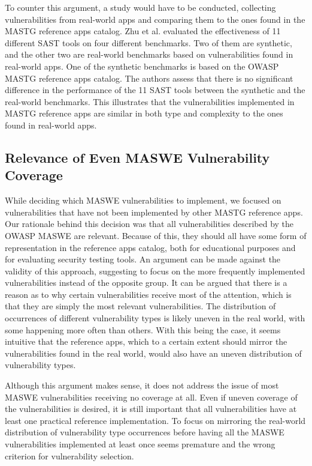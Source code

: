 To counter this argument, a study would have to be conducted, collecting vulnerabilities from real-world apps and comparing them to the ones found in the MASTG reference apps catalog. Zhu et al. \cite{paper_19} evaluated the effectiveness of 11 different SAST tools on four different benchmarks. Two of them are synthetic, and the other two are real-world benchmarks based on vulnerabilities found in real-world apps. One of the synthetic benchmarks is based on the OWASP MASTG reference apps catalog. The authors assess that there is no significant difference in the performance of the 11 SAST tools between the synthetic and the real-world benchmarks. This illustrates that the vulnerabilities implemented in MASTG reference apps are similar in both type and complexity to the ones found in real-world apps.

\subsection{Relevance of Even MASWE Vulnerability Coverage}
While deciding which MASWE vulnerabilities to implement, we focused on vulnerabilities that have not been implemented by other MASTG reference apps. Our rationale behind this decision was that all vulnerabilities described by the OWASP MASWE are relevant. Because of this, they should all have some form of representation in the reference apps catalog, both for educational purposes and for evaluating security testing tools. An argument can be made against the validity of this approach, suggesting to focus on the more frequently implemented vulnerabilities instead of the opposite group. It can be argued that there is a reason as to why certain vulnerabilities receive most of the attention, which is that they are simply the most relevant vulnerabilities. The distribution of occurrences of different vulnerability types is likely uneven in the real world, with some happening more often than others. With this being the case, it seems intuitive that the reference apps, which to a certain extent should mirror the vulnerabilities found in the real world, would also have an uneven distribution of vulnerability types.

Although this argument makes sense, it does not address the issue of most MASWE vulnerabilities receiving no coverage at all. Even if uneven coverage of the vulnerabilities is desired, it is still important that all vulnerabilities have at least one practical reference implementation. To focus on mirroring the real-world distribution of vulnerability type occurrences before having all the MASWE vulnerabilities implemented at least once seems premature and the wrong criterion for vulnerability selection.


